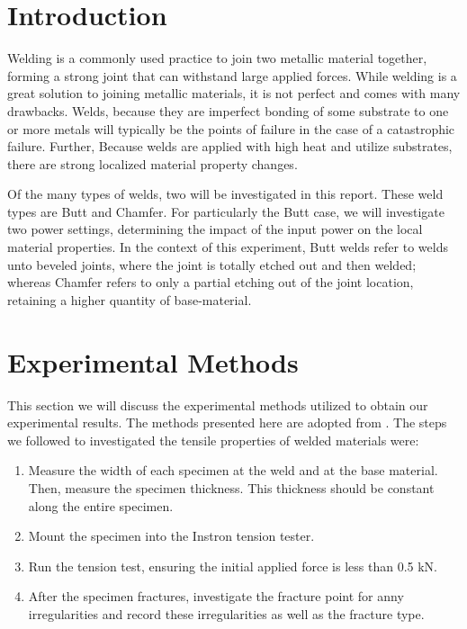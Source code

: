 \documentclass{article}
\begin{document}
\newpage  
\section{Introduction}
Welding is a commonly used practice to join two metallic material together, forming a strong joint that can withstand large applied forces. While welding is a great solution to joining metallic materials, it is not perfect and comes with many drawbacks. Welds, because they are imperfect bonding of some substrate to one or more metals will typically be the points of failure in the case of a catastrophic failure. Further, Because welds are applied with high heat and utilize substrates, there are strong localized material property changes. 

Of the many types of welds, two will be investigated in this report. These weld types are Butt and Chamfer. For particularly the Butt case, we will investigate two power settings, determining the impact of the input power on the local material properties. In the context of this experiment, Butt welds refer to welds unto beveled joints, where the joint is totally etched out and then welded; whereas Chamfer refers to only a partial etching out of the joint location, retaining a higher quantity of base-material. 

\section{Experimental Methods}

This section we will discuss the experimental methods utilized to obtain our experimental results. The methods presented here are adopted from \cite{manual}. The steps we followed to investigated the tensile properties of welded materials were:
\begin{enumerate}
    \item Measure the width of each specimen at the weld and at the base material. Then, measure the specimen thickness. This thickness should be constant along the entire specimen. 
    \item Mount the specimen into the Instron tension tester. 
    \item Run the tension test, ensuring the initial applied force is less than 0.5 kN.
    \item After the specimen fractures, investigate the fracture point for anny irregularities and record these irregularities as well as the fracture type. 
\end{enumerate}
\end{document}
